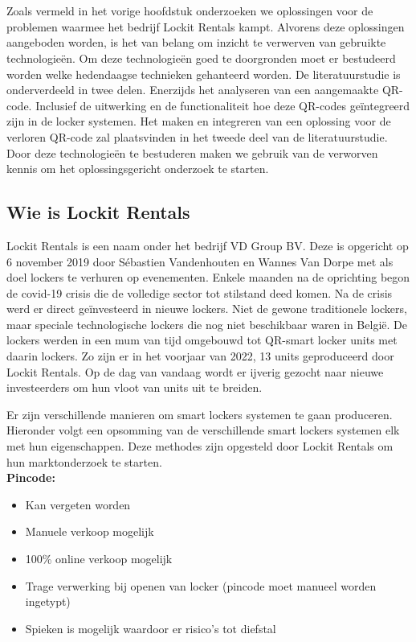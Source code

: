 \chapter{}%
\label{ch:stand-van-zaken}

Zoals vermeld in het vorige hoofdstuk onderzoeken we oplossingen voor de problemen waarmee het bedrijf Lockit Rentals kampt. Alvorens deze oplossingen aangeboden worden, is het van belang om inzicht te verwerven van gebruikte technologieën. Om deze technologieën goed te doorgronden moet er bestudeerd worden welke hedendaagse technieken gehanteerd worden. De literatuurstudie is onderverdeeld in twee delen. Enerzijds het analyseren van een aangemaakte QR-code. Inclusief de uitwerking en de functionaliteit hoe deze QR-codes geïntegreerd zijn in de locker systemen. Het maken en integreren van een oplossing voor de verloren QR-code zal plaatsvinden in het tweede deel van de literatuurstudie. Door deze technologieën te bestuderen maken we gebruik van de verworven kennis om het oplossingsgericht onderzoek te starten.

\section{Wie is Lockit Rentals}%
\label{sec:lockitRentals}


Lockit Rentals is een naam onder het bedrijf VD Group BV. Deze is opgericht op 6 november 2019 door Sébastien Vandenhouten en Wannes Van Dorpe met als doel lockers te verhuren op evenementen. Enkele maanden na de oprichting begon de covid-19 crisis die de volledige sector tot stilstand deed komen. Na de crisis werd er direct geïnvesteerd in nieuwe lockers. Niet de gewone traditionele lockers, maar speciale technologische lockers die nog niet beschikbaar waren in België. De lockers werden in een mum van tijd omgebouwd tot QR-smart locker units met daarin lockers. Zo zijn er in het voorjaar van 2022, 13 units geproduceerd door Lockit Rentals. Op de dag van vandaag wordt er ijverig gezocht naar nieuwe investeerders om hun vloot van units uit te breiden.

Er zijn verschillende manieren om smart lockers systemen te gaan produceren. Hieronder volgt een opsomming van de verschillende smart lockers systemen elk met hun eigenschappen. Deze methodes zijn opgesteld door Lockit Rentals om hun marktonderzoek te starten.
\\
\textbf{Pincode:}
\begin{itemize}
    \item Kan vergeten worden
    \item Manuele verkoop mogelijk
    \item 100\% online verkoop mogelijk
    \item Trage verwerking bij openen van locker (pincode moet manueel worden ingetypt)
    \item Spieken is mogelijk waardoor er risico’s tot diefstal    
\end{itemize}

